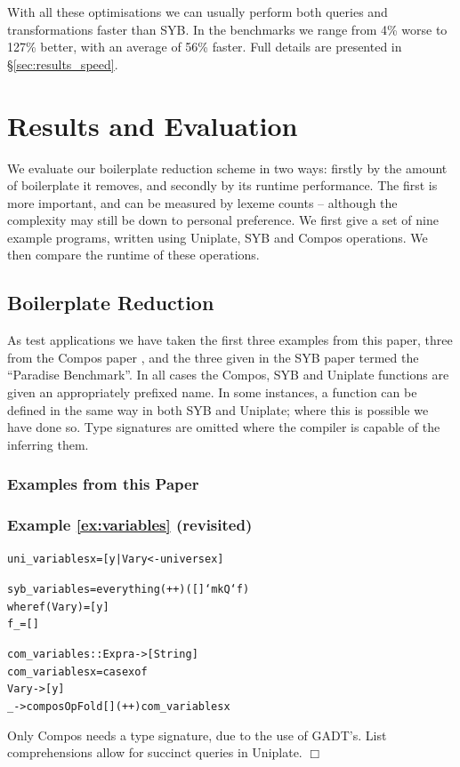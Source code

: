 \documentclass[preprint]{sigplanconf}
\newcommand{\noexample}{\hfill$\Box$}
\newenvironment{code}{\begin{alltt}\small}{\end{alltt}}
\newenvironment{revisit}[1]{\subsubsection*{Example #1 (revisited)}}{\noexample}
\newcommand{\ignore}{}
\begin{document}
With all these optimisations we can usually perform both queries and transformations faster than SYB. In the benchmarks we range from 4\% worse to 127\% better, with an average of 56\% faster. Full details are presented in \S\ref{sec:results_speed}.


\section{Results and Evaluation}
\label{sec:results}

We evaluate our boilerplate reduction scheme in two ways: firstly by the amount of boilerplate it removes, and secondly by its runtime performance. The first is more important, and can be measured by lexeme counts -- although the complexity may still be down to personal preference. We first give a set of nine example programs, written using Uniplate, SYB and Compos operations. We then compare the runtime of these operations.

\subsection{Boilerplate Reduction}
\label{sec:results_boilerplate}

As test applications we have taken the first three examples from this paper, three from the Compos paper \citep{bringert:compos}, and the three given in the SYB paper \citep{lammel:syb} termed the ``Paradise Benchmark''. In all cases the Compos, SYB and Uniplate functions are given an appropriately prefixed name. In some instances, a function can be defined in the same way in both SYB and Uniplate; where this is possible we have done so. Type signatures are omitted where the compiler is capable of the inferring them.

\subsubsection{Examples from this Paper}

\begin{revisit}{\ref{ex:variables}}

\ignore\begin{code}
uni_variables x = [y | Var y <- universe x]

syb_variables = everything (++) ([] `mkQ` f)
    where  f (Var y)  = [y]
           f _        = []

com_variables :: Expr a -> [String]
com_variables x = case x of
    Var y -> [y]
    _ -> composOpFold [] (++) com_variables x
\end{code}

Only Compos needs a type signature, due to the use of GADT's. List comprehensions allow for succinct queries in Uniplate.
\end{revisit}
\end{document}
